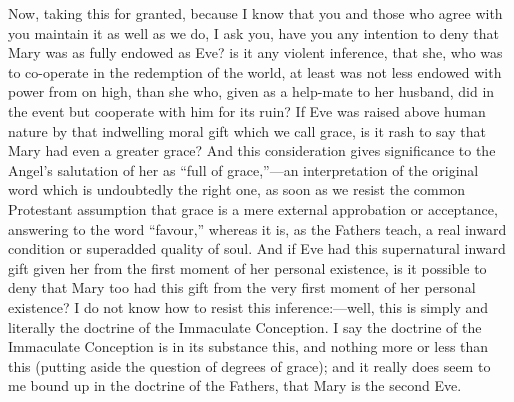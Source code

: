 Now, taking this for granted, because I know that you and those who
agree with you maintain it as well as we do, I ask you, have you any
intention to deny that Mary was as fully endowed as Eve? is it any
violent inference, that she, who was to co-operate in the redemption of
the world, at least was not less endowed with power from on high, than
she who, given as a help-mate to her husband, did in the event but
cooperate with him for its ruin? If Eve was raised above human nature by
that indwelling moral gift which we call grace, is it rash to say that
Mary had even a greater grace? And this consideration gives significance
to the Angel's salutation of her as ``full of grace,''—an
interpretation of the original word which is undoubtedly the right
one, as soon as we resist the common Protestant assumption that grace is
a mere external approbation or acceptance, answering to the word ``favour,''
whereas it is, as the Fathers teach, a real inward condition or
superadded quality of soul. And if Eve had this supernatural inward gift
given her from the first moment of her personal existence, is it
possible to deny that Mary too had this gift from the very first moment
of her personal existence? I do not know how to resist this inference:—well,
this is simply and literally the doctrine of the Immaculate Conception.
I say the doctrine of the Immaculate Conception is in its substance
this, and nothing more or less than this (putting aside the question of
degrees of grace); and it really does seem to me bound up in the
doctrine of the Fathers, that Mary is the second Eve.

